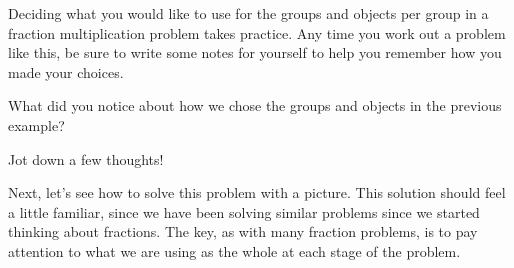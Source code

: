 \documentclass{ximera}
\begin{document}
Deciding what you would like to use for the groups and objects per group in a fraction multiplication problem takes practice. Any time you work out a problem like this, be sure to write some notes for yourself to help you remember how you made your choices. 

\begin{question}
What did you notice about how we chose the groups and objects in the previous example?
\begin{freeResponse}
Jot down a few thoughts!
\end{freeResponse}
\end{question}

Next, let's see how to solve this problem with a picture. This solution should feel a little familiar, since we have been solving similar problems since we started thinking about fractions. The key, as with many fraction problems, is to pay attention to what we are using as the whole at each stage of the problem.
\end{document}
